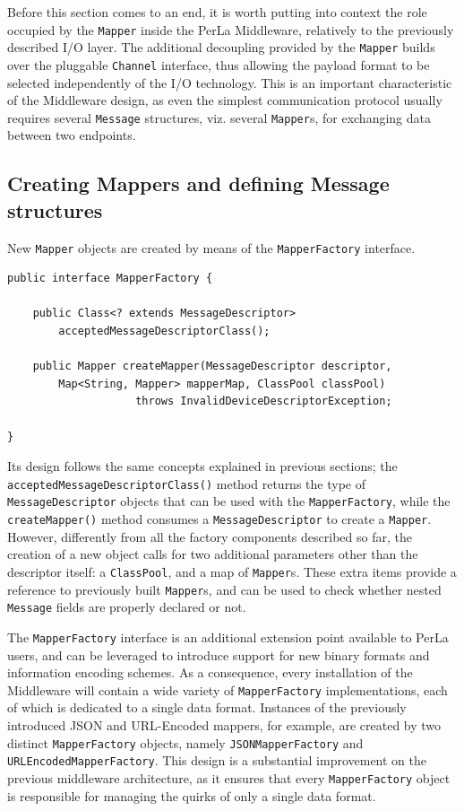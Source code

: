 Before this section comes to an end, it is worth putting into context the role
occupied by the \texttt{Mapper} inside the PerLa Middleware, relatively to the
previously described I/O layer. The additional decoupling provided by the
\texttt{Mapper} builds over the pluggable \texttt{Channel} interface, thus
allowing the payload format to be selected independently of the I/O technology.
This is an important characteristic of the Middleware design, as even the
simplest communication protocol usually requires several \texttt{Message}
structures, viz. several \texttt{Mapper}s, for exchanging data between two
endpoints.


\subsection{Creating Mappers and defining Message structures}

New \texttt{Mapper} objects are created by means of the \texttt{MapperFactory}
interface.

\lstset{language=Java}
\begin{lstlisting}[float,floatplacement=!hbt,caption=The Mapper Factory
interface,label={lst:mapperFactory}]
public interface MapperFactory {

    public Class<? extends MessageDescriptor>
        acceptedMessageDescriptorClass();

    public Mapper createMapper(MessageDescriptor descriptor,
        Map<String, Mapper> mapperMap, ClassPool classPool)
                    throws InvalidDeviceDescriptorException;

}
\end{lstlisting}

Its design follows the same concepts explained in previous sections; the
\texttt{acceptedMessageDescriptorClass()} method returns the type of
\texttt{MessageDescriptor} objects that can be used with the
\texttt{MapperFactory}, while the \texttt{createMapper()} method consumes a
\texttt{MessageDescriptor} to create a \texttt{Mapper}. However, differently
from all the factory components described so far, the creation of a new object
calls for two additional parameters other than the descriptor itself: a
\texttt{ClassPool}, and a map of \texttt{Mapper}s. These extra items provide a
reference to previously built \texttt{Mapper}s, and can be used to check
whether nested \texttt{Message} fields are properly declared or not.

The \texttt{MapperFactory} interface is an additional extension point available
to PerLa users, and can be leveraged to introduce support for new binary
formats and information encoding schemes. As a consequence, every installation
of the Middleware will contain a wide variety of \texttt{MapperFactory}
implementations, each of which is dedicated to a single data format. Instances
of the previously introduced JSON and URL-Encoded mappers, for example, are
created by two distinct \texttt{MapperFactory} objects, namely
\texttt{JSONMapperFactory} and \texttt{URLEncodedMapperFactory}. This design is
a substantial improvement on the previous middleware architecture, as it
ensures that every \texttt{MapperFactory} object is responsible for managing
the quirks of only a single data format.

